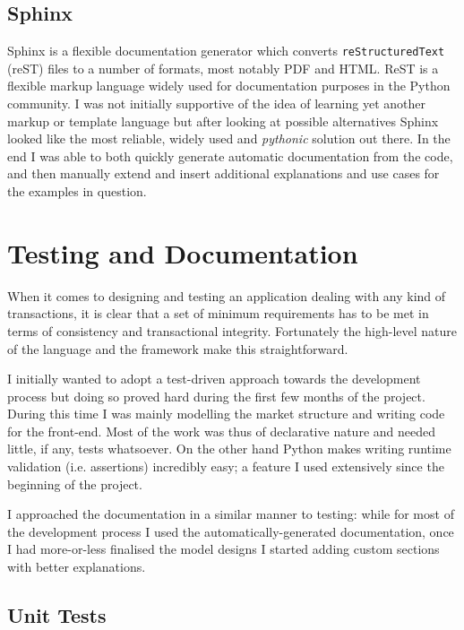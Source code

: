 \documentclass[bsc,frontabs,twoside,singlespacing,parskip,deptreport]{infthesis}     %
\begin{document}
\subsection{Sphinx}
    Sphinx is a flexible documentation generator which converts {\tt reStructuredText} (reST) files to a number of formats, most notably PDF and HTML. ReST is a flexible markup language widely used for documentation purposes in the Python community. I was not initially supportive of the idea of learning yet another markup or template language but after looking at possible alternatives Sphinx looked like the most reliable, widely used and {\em pythonic} solution out there. In the end I was able to both quickly generate automatic documentation from the code, and then manually extend and insert additional explanations and use cases for the examples in question.

\section{Testing and Documentation}
    When it comes to designing and testing an application dealing with any kind of transactions, it is clear that a set of minimum requirements has to be met in terms of consistency and transactional integrity. Fortunately the high-level nature of the language and the framework make this straightforward.

I initially wanted to adopt a test-driven approach towards the development process but doing so proved hard during  the first few months of the project. During this time I was mainly modelling the market structure and writing code for the front-end. Most of the work was thus of declarative nature and needed little, if any, tests whatsoever. On the other hand Python makes writing runtime validation (i.e. assertions) incredibly easy; a feature I used extensively since the beginning of the project. 

I approached the documentation in a similar manner to testing: while for most of the development process I used the automatically-generated documentation, once I had more-or-less finalised the model designs I started adding custom sections with better explanations. 

\subsection{Unit Tests}
\end{document}
